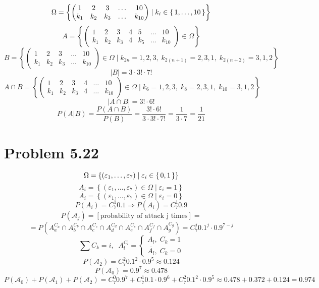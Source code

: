 \documentclass[12pt,letterpaper]{article}
\begin{document}
\[ \Omega = \left\{
        \begin{pmatrix}
            1 & 2 & 3 & \dots & 10 \\
            k_1 & k_2 & k_3 & \dots & k_{10}
        \end{pmatrix} \mid 
        k_i \in \set{ 1, \dots, 10 }
\right\} \]
\[ A = \left\{
        \begin{pmatrix}
            1 & 2 & 3 & 4 & 5 & \dots & 10 \\
            k_1 & k_2 & k_3 & 4 & k_5 & \dots & k_{10}
        \end{pmatrix} \in \Omega 
\right\} \]
\[ B = \left\{
        \begin{pmatrix}
            1 & 2 & 3 & \dots & 10 \\
            k_1 & k_2 & k_3 & \dots & k_{10}
        \end{pmatrix} \in \Omega \mid
        k_{2n} = 1, 2, 3, \; k_{2(n+1)} = 2, 3, 1, \; k_{2(n+2)} = 3, 1, 2
\right\} \]
\[ |B| = 3 \cdot 3! \cdot 7! \]
\[ A \cap B = \left\{
        \begin{pmatrix}
            1 & 2 & 3 & 4 & \dots & 10 \\
            k_1 & k_2 & k_3 & 4 & \dots & k_10
        \end{pmatrix} \in \Omega \mid
        k_6 = 1, 2, 3, \; k_8 = 2, 3, 1, \; k_10 = 3, 1, 2
\right\} \]
\[ |A \cap B| = 3! \cdot 6! \]
\[ P(A|B) = \frac{P(A \cap B)}{P(B)} = \frac{3! \cdot 6!}{ 3 \cdot 3! \cdot 7!} = \frac{1}{3 \cdot
7} = \frac{1}{21} \]

\section*{Problem 5.22}
\[ \Omega = \left\{
        (\varepsilon_1, \dots, \varepsilon_7) \mid
        \varepsilon_i \in \set{0, 1}
\right\} \]
\[ A_i = \left\{
        (\varepsilon_1, \dots, \varepsilon_7) \in \Omega \mid
        \varepsilon_i = 1
\right\} \]
\[ \overline{A_i} = \left\{
        (\varepsilon_1, \dots, \varepsilon_7) \in \Omega \mid
        \varepsilon_i = 0
\right\} \]
\[ P(A_i) = C_{7}^{1} 0.1 \Rightarrow P(\overline{A_i}) = C_{7}^{1} 0.9 \]
\[ P(\mathcal{A}_j) = [ \text{probability of attack j times} ] = \] 
\[ = P( A_{a}^{C_a} \cap  A_{b}^{C_b} \cap A_{c}^{C_c} \cap A_{d}^{C_d} \cap A_{e}^{C_e} \cap A_{f}^{C_f}
\cap A_{g}^{C_g} ) = C_{7}^{j} 0.1 ^ {j} \cdot 0.9^{7-j} \]
\[ \sum C_k = i, \;\; A_{l}^{C_l} = \begin{cases}
    A_l, \; C_k = 1 \\
    \overline{A_l}, \; C_k = 0
\end{cases}
\]
\[ P(\mathcal{A}_2) = C_{7}^{2} 0.1^2 \cdot 0.9^5 \approx 0.124 \]
\[ P(\mathcal{A}_0) = 0.9^7 \approx 0.478 \]
\[ P(\mathcal{A}_0) + P(\mathcal{A}_1) + P(\mathcal{A}_2) = C_{7}^{0} 0.9^7 + C_{7}^{1}
    0.1\cdot0.9^6 + C_{7}^{2} 0.1^2 \cdot
0.9^5 \approx 0.478 + 0.372 + 0.124 = 0.974 \]
\end{document}

